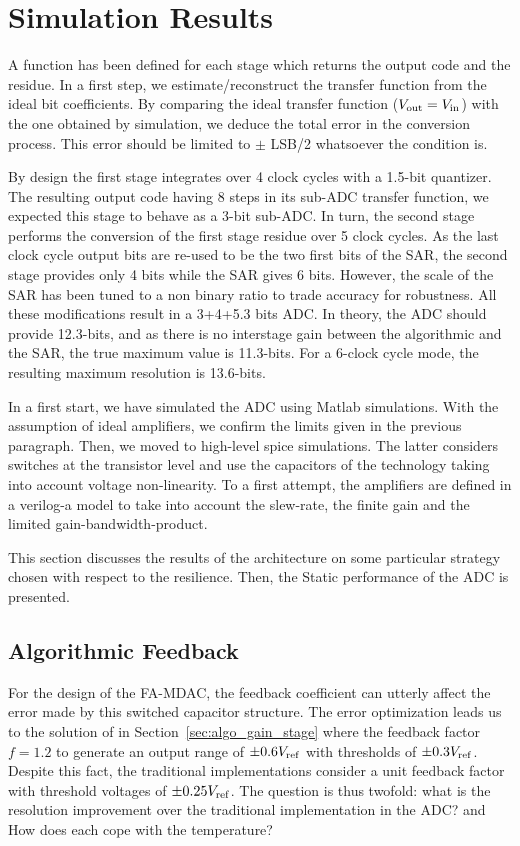 \section{Simulation Results}             %
A function has been defined for each stage which returns the output code and the residue. In a first step, we estimate/reconstruct the transfer function from the ideal bit coefficients. By comparing the ideal transfer function ($V_{\rm out} = V_{\rm in}$) with the one obtained by simulation, we deduce the total error in the conversion process. This error should be limited to $\pm$ LSB/2 whatsoever the condition is.

By design the first stage integrates over 4 clock cycles with a 1.5-bit quantizer. The resulting output code having 8 steps in its sub-ADC transfer function, we expected this stage to behave as a 3-bit sub-ADC\@. In turn, the second stage performs the conversion of the first stage residue over 5 clock cycles. As the last clock cycle output bits are re-used to be the two first bits of the SAR, the second stage provides only 4 bits while the SAR gives 6 bits. However, the scale of the SAR has been tuned to a non binary ratio to trade accuracy for robustness. All these modifications result in a 3+4+5.3 bits ADC\@. In theory, the ADC should provide 12.3-bits, and as there is no interstage gain between the algorithmic and the SAR, the true maximum value is 11.3-bits. For a 6-clock cycle mode, the resulting maximum resolution is 13.6-bits.

In a first start, we have simulated the ADC using Matlab simulations. With the assumption of ideal amplifiers, we confirm the limits given in the previous paragraph. Then, we moved to high-level spice simulations. The latter considers switches at the transistor level and use the capacitors of the technology taking into account voltage non-linearity. To a first attempt, the amplifiers are defined in a verilog-a model to take into account the slew-rate, the finite gain and the limited gain-bandwidth-product.

This section discusses the results of the architecture on some particular strategy chosen with respect to the resilience. Then, the Static performance of the ADC is presented.

\subsection{Algorithmic Feedback}
For the design of the FA-MDAC, the feedback coefficient can utterly affect the error made by this switched capacitor structure. The error optimization leads us to the solution of in Section~\ref{sec:algo_gain_stage} where the feedback factor \(f = 1.2\) to generate an output range of \(\pm 0.6 V_{\rm ref}\) with thresholds of \(\pm 0.3 V_{\rm ref}\). Despite this fact, the traditional implementations consider a unit feedback factor with threshold voltages of \(\pm 0.25 V_{\rm ref}\). The question is thus twofold: what is the resolution improvement over the traditional implementation in the ADC\@? and How does each cope with the temperature?

